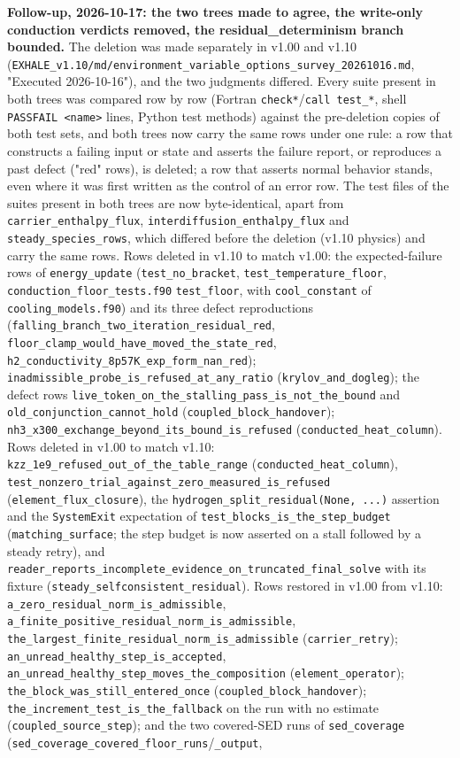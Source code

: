 \documentclass[english,a4paper]{my_memo}
\begin{document}
\textbf{Follow-up, 2026-10-17: the two trees made to agree, the write-only conduction verdicts removed, the residual\_determinism branch bounded.} The deletion was made separately in v1.00 and v1.10 (\texttt{EXHALE\_v1.10/md/environment\_variable\_options\_survey\_20261016.md}, "Executed 2026-10-16"), and the two judgments differed. Every suite present in both trees was compared row by row (Fortran \texttt{check*}/\texttt{call\ test\_*}, shell \texttt{PASS\textbar{}FAIL\ \textless{}name\textgreater{}} lines, Python test methods) against the pre-deletion copies of both test sets, and both trees now carry the same rows under one rule: a row that constructs a failing input or state and asserts the failure report, or reproduces a past defect ("red" rows), is deleted; a row that asserts normal behavior stands, even where it was first written as the control of an error row. The test files of the suites present in both trees are now byte-identical, apart from \texttt{carrier\_enthalpy\_flux}, \texttt{interdiffusion\_enthalpy\_flux} and \texttt{steady\_species\_rows}, which differed before the deletion (v1.10 physics) and carry the same rows. Rows deleted in v1.10 to match v1.00: the expected-failure rows of \texttt{energy\_update} (\texttt{test\_no\_bracket}, \texttt{test\_temperature\_floor}, \texttt{conduction\_floor\_tests.f90} \texttt{test\_floor}, with \texttt{cool\_constant} of \texttt{cooling\_models.f90}) and its three defect reproductions (\texttt{falling\_branch\_two\_iteration\_residual\_red}, \texttt{floor\_clamp\_would\_have\_moved\_the\_state\_red}, \texttt{h2\_conductivity\_8p57K\_exp\_form\_nan\_red}); \texttt{inadmissible\_probe\_is\_refused\_at\_any\_ratio} (\texttt{krylov\_and\_dogleg}); the defect rows \texttt{live\_token\_on\_the\_stalling\_pass\_is\_not\_the\_bound} and \texttt{old\_conjunction\_cannot\_hold} (\texttt{coupled\_block\_handover}); \texttt{nh3\_x300\_exchange\_beyond\_its\_bound\_is\_refused} (\texttt{conducted\_heat\_column}). Rows deleted in v1.00 to match v1.10: \texttt{kzz\_1e9\_refused\_out\_of\_the\_table\_range} (\texttt{conducted\_heat\_column}), \texttt{test\_nonzero\_trial\_against\_zero\_measured\_is\_refused} (\texttt{element\_flux\_closure}), the \texttt{hydrogen\_split\_residual(None,\ ...)} assertion and the \texttt{SystemExit} expectation of \texttt{test\_blocks\_is\_the\_step\_budget} (\texttt{matching\_surface}; the step budget is now asserted on a stall followed by a steady retry), and \texttt{reader\_reports\_incomplete\_evidence\_on\_truncated\_final\_solve} with its fixture (\texttt{steady\_selfconsistent\_residual}). Rows restored in v1.00 from v1.10: \texttt{a\_zero\_residual\_norm\_is\_admissible}, \texttt{a\_finite\_positive\_residual\_norm\_is\_admissible}, \texttt{the\_largest\_finite\_residual\_norm\_is\_admissible} (\texttt{carrier\_retry}); \texttt{an\_unread\_healthy\_step\_is\_accepted}, \texttt{an\_unread\_healthy\_step\_moves\_the\_composition} (\texttt{element\_operator}); \texttt{the\_block\_was\_still\_entered\_once} (\texttt{coupled\_block\_handover}); \texttt{the\_increment\_test\_is\_the\_fallback} on the run with no estimate (\texttt{coupled\_source\_step}); and the two covered-SED runs of \texttt{sed\_coverage} (\texttt{sed\_coverage\_covered\_floor\_runs}/\texttt{\_output}, 
\end{document}
